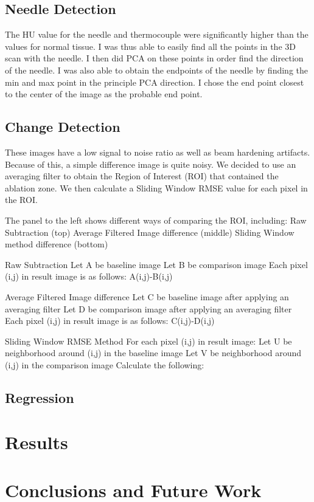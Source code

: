\documentclass[]{spie}  %
\begin{document}
\subsection{Needle Detection}

The HU value for the needle and thermocouple were significantly higher than the values for normal tissue. I was thus able to easily find all the points in the 3D scan with the needle. I then did PCA on these points in order find the direction of the needle. I was also able to obtain the endpoints of the needle by finding the min and max point in the principle PCA direction. I chose the end point closest to the center of the image as the probable end point. 

\subsection{Change Detection}

These images have a low signal to noise ratio as well as beam hardening artifacts. Because of this, a simple difference image is quite noisy. We decided to use an averaging filter to obtain the Region of Interest (ROI) that contained the ablation zone. We then calculate a Sliding Window RMSE value for each pixel in the ROI. 

The panel to the left shows different ways of comparing the ROI, including:
Raw Subtraction (top)
Average Filtered Image difference (middle)
Sliding Window method difference (bottom)

Raw Subtraction
Let A be baseline image 
Let B be comparison image 
Each pixel (i,j) in result image is as follows: A(i,j)-B(i,j)

Average Filtered Image difference
Let C be baseline image after applying an averaging filter
Let D be comparison image after applying an averaging filter
Each pixel (i,j) in result image is as follows: C(i,j)-D(i,j)

Sliding Window RMSE Method
For each pixel (i,j) in result image: 
Let U be neighborhood around (i,j) in the baseline image
Let V be neighborhood around (i,j) in the comparison image
Calculate the following:


\subsection{Regression}

\section{Results}

\section{Conclusions and Future Work}




\end{document}
